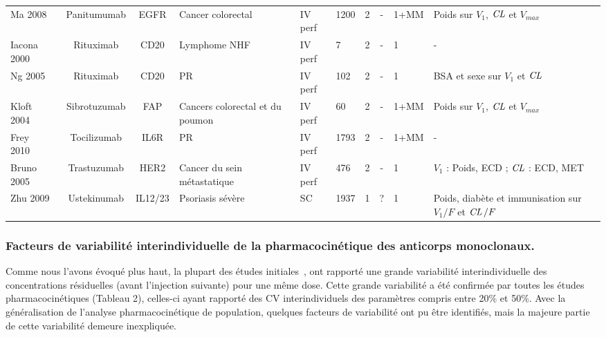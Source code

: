 \begin{table}[!ht]
\begin{tabular}{p{1.6cm}ccp{1.8cm}p{.8cm}p{.9cm}ccp{.9cm}l}
      Ma 2008~\citep{REF73} & Panitumumab & EGFR & Cancer colorectal & \gls{IV} perf & 1200 & 2 & - & 1+MM & Poids sur $V_1$, $\operatorname{\textit{CL}}$ et $V_{max}$ \\
      Iacona 2000~\citep{REF51} & Rituximab & CD20 & Lymphome NHF & \gls{IV} perf & 7 & 2 & - & 1 & - \\
      Ng 2005~\citep{REF52} & Rituximab & CD20 & PR & \gls{IV} perf & 102 & 2 & - & 1 & BSA et sexe sur $V_1$ et $\operatorname{\textit{CL}}$ \\
      Kloft 2004~\citep{REF74} & Sibrotuzumab & FAP & Cancers colorectal et du poumon & \gls{IV} perf & 60 & 2 & - & 1+MM & Poids sur $V_1$,  $\operatorname{\textit{CL}}$ et $V_{max}$ \\
      Frey 2010~\citep{REF75} & Tocilizumab & IL6R & PR & \gls{IV} perf & 1793 & 2 & - & 1+MM & - \\
      Bruno 2005~\citep{REF76} & Trastuzumab & HER2 & Cancer du sein métastatique & \gls{IV} perf & 476 & 2 & - & 1 & $V_1$ : Poids, ECD ; $\operatorname{\textit{CL}}$ : ECD, MET \\
      Zhu 2009~\citep{REF77} & Ustekinumab & IL12/23 & Psoriasis sévère & SC & 1937 & 1 & ? & 1 & Poids, diabète et immunisation sur $V_1/F$ et $\operatorname{\textit{CL}}/F$ \\
      \hline
    \end{tabular}
  \label{tab:2}
\end{table}

\subsubsection{Facteurs de variabilité interindividuelle de la pharmacocinétique des anticorps monoclonaux.}
Comme nous l'avons évoqué plus haut, la plupart des études initiales~\citep{REF53, REF54, REF58, REF60}, ont rapporté une grande variabilité interindividuelle des concentrations résiduelles (avant l'injection suivante) pour une même dose. Cette grande variabilité a été confirmée par toutes les études pharmacocinétiques (Tableau 2), celles-ci ayant rapporté des CV interindividuels des paramètres compris entre 20\% et 50\%. Avec la généralisation de l'analyse pharmacocinétique de population, quelques facteurs de variabilité ont pu être identifiés, mais la majeure partie de cette variabilité demeure inexpliquée.
